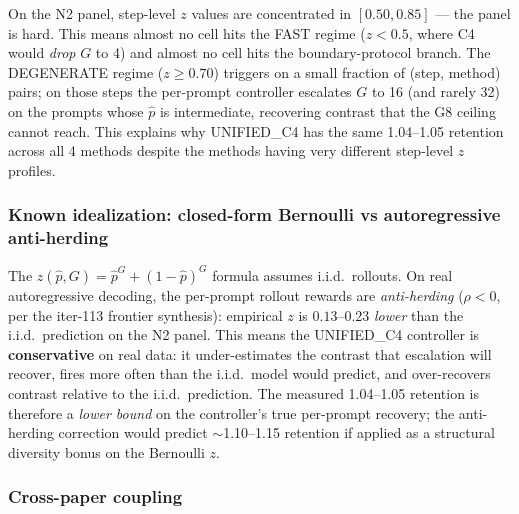 \documentclass{article}
\begin{document}
On the N2 panel, step-level $z$ values are concentrated in $[0.50, 0.85]$
--- the panel is hard. This means almost no cell hits the FAST regime
($z<0.5$, where C4 would \emph{drop} $G$ to 4) and almost no cell hits the
boundary-protocol branch. The DEGENERATE regime ($z \geq 0.70$) triggers
on a small fraction of (step, method) pairs; on those steps the per-prompt
controller escalates $G$ to 16 (and rarely 32) on the prompts whose
$\hat p$ is intermediate, recovering contrast that the G8 ceiling cannot
reach. This explains why UNIFIED\_C4 has the same 1.04--1.05 retention
across all 4 methods despite the methods having very different step-level
$z$ profiles.

\subsubsection*{Known idealization: closed-form Bernoulli vs autoregressive anti-herding}

The $z(\hat p, G) = \hat p^G + (1-\hat p)^G$ formula assumes i.i.d.\ rollouts.
On real autoregressive decoding, the per-prompt rollout rewards are
\emph{anti-herding} ($\rho < 0$, per the iter-113 frontier synthesis):
empirical $z$ is $0.13$--$0.23$ \emph{lower} than the i.i.d.\ prediction
on the N2 panel. This means the UNIFIED\_C4 controller is
\textbf{conservative} on real data: it under-estimates the contrast that
escalation will recover, fires more often than the i.i.d.\ model would
predict, and over-recovers contrast relative to the i.i.d.\ prediction.
The measured 1.04--1.05 retention is therefore a \emph{lower bound} on
the controller's true per-prompt recovery; the anti-herding correction
would predict $\sim$1.10--1.15 retention if applied as a structural
diversity bonus on the Bernoulli $z$.

\subsubsection*{Cross-paper coupling}
\end{document}
